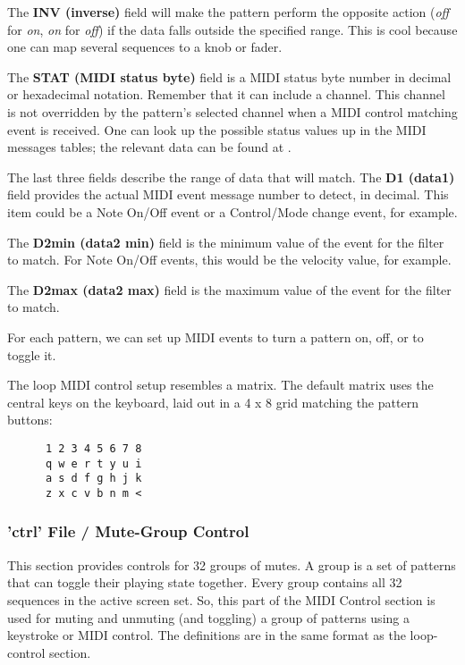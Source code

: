    The \textbf{INV (inverse)} field will make the pattern perform the opposite
   action (\textsl{off} for \textsl{on}, \textsl{on} for \textsl{off}) if the
   data falls outside the specified range.  This is cool because one can map
   several sequences to a knob or fader.

   The \textbf{STAT (MIDI status byte)} field is a MIDI status byte number in
   decimal or hexadecimal notation.
   Remember that it can include a channel.  This channel is not overridden by
   the pattern's selected channel when a MIDI control matching event is
   received. 
   One can look up the possible status values up in the MIDI messages tables;
   the relevant data can be found at \cite{midicontroltable}.

   The last three fields describe the range of data that will match.  The
   \textbf{D1 (data1)} field provides the actual MIDI event message number to
   detect, in decimal.  This item could be a Note On/Off event or a
   Control/Mode change event, for example.

   The \textbf{D2min (data2 min)} field is the minimum value of the event for
   the filter to match. For Note On/Off events, this would be the velocity
   value, for example.

   The \textbf{D2max (data2 max)} field is the maximum value of the event for
   the filter to match.


   For each pattern, we can set up MIDI events to turn a 
   pattern on, off, or to toggle it.

   The loop MIDI control setup resembles a matrix.  The default matrix
   uses the central keys on the keyboard, laid out in a 4 x 8 grid matching the
   pattern buttons:

   \begin{verbatim}
      1 2 3 4 5 6 7 8
      q w e r t y u i
      a s d f g h j k
      z x c v b n m <
   \end{verbatim}

\subsubsection{'ctrl' File / Mute-Group Control}
\label{subsubsec:configuration_ctrl_mute_group_control}

   This section provides controls for 32 groups of mutes.
   A group is a set of patterns that can toggle their playing state
   together.  Every group contains all 32 sequences in the active screen set.
   So, this part of the MIDI Control section is used for muting and unmuting
   (and toggling) a group of patterns using a keystroke or MIDI control.
   The definitions are in the same format as the loop-control section.

